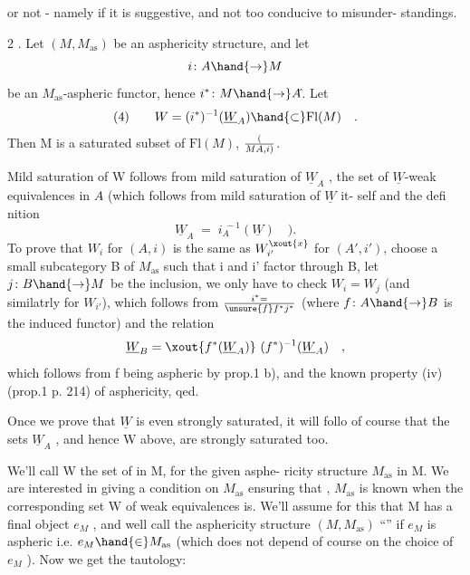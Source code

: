 
or not  -  namely if it is suggestive,  and not too conducive to misunder-%
standings.

\hand{\uline{\textcolor{black}{Proposition}}} 2 .  Let $(M,M_{\mathrm{as}})$ be an asphericity structure,  and let
\[ i\colon A \hand{\to} M \]
be an $M_{\mathrm{as}}$-aspheric functor,  hence $i^{*}\colon M \hand{\to} A\hat{}$.  Let
\[ \text{(4)} \qquad W =(i^{*})^{-1}(\underline{W}_A) \hand{\subset} \mathrm{Fl}(M) \quad . \]
Then M is a  saturated subset of $\mathrm{Fl}(M)$,  \hand{\uline{\textcolor{black}{independant}}} \hand{\uline{\textcolor{black}{of the choice of}}} $(\over{M}{A},i)$.

Mild saturation of W follows from mild saturation of $\underline{W}_A$ ,  the set
of $\underline{W}$-weak equivalences in $A\hat{}$ (which follows from mild saturation of $\underline{W}$ it-%
self and the defi nition
\[ \underline{W}_A \;=\; i_A^{\;-1}(\underline{W}) \quad ). \]
To prove that $W_i$ for $(A,i)$ is the same as $W^{\xout{x}}_{i'}$ for $(A',i')$,  choose a small
 subcategory B of $M_{\mathrm{as}}$ such that i and i' factor through  B,  let $j\colon B \hand{\to} M$
be the inclusion,  we only have to check $W_i = W_j$  (and similatrly for $W_{i'}$),
which follows from  $i^{*} = \over{\unsure{f}}{f}^{*}j^{*}$  (where $f\colon A \hand{\to} B$ is the induced functor)
and the relation
\[ \underline{W}_B = \xout{f^{*}(\underline{W}_A)}\ (f^{*})^{-1}(\underline{W}_A) \quad , \]
which follows from f being aspheric by prop.1 b),  and the known property
(iv) (prop.1\hand{,} p. 214) of asphericity,  qed.

  Once we prove that $\underline{W}$  is even strongly saturated,  it will follo
of course that the sets $\underline{W}_A$ ,  and hence W above,  are strongly saturated
too.

We'll call W the set of \hand{\uline{\textcolor{black}{weak}}} \hand{\uline{\textcolor{black}{equivalences}}} in M,  for the given asphe-%
ricity structure $M_{\mathrm{as}}$ in M.  We are interested  in giving a condition on $M_{\mathrm{as}}$
ensuring that ,  $M_{\mathrm{as}}$ is known when the corresponding set W of
weak equivalences is.  We'll  assume for this that M has a
final object $e_M$ ,  and well call the asphericity structure $(M,M_{\mathrm{as}})$
``\hand{\uline{\textcolor{black}{aspheric}}}''  if  $e_M$ is aspheric i.e.  $e_M \hand{\in} M_{\mathrm{as}}$  (which does not depend of
course on the choice of $e_M$ ).  Now we get the tautology:

